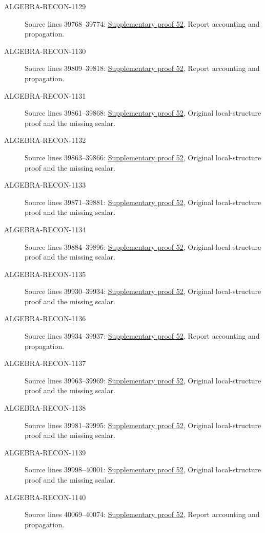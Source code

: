 \begin{description}
\item[ALGEBRA-RECON-1129] Source lines 39768--39774: \hyperlink{algebra_etale_local_notes_20260928}{Supplementary proof 52}, Report accounting and propagation.
\item[ALGEBRA-RECON-1130] Source lines 39809--39818: \hyperlink{algebra_etale_local_notes_20260928}{Supplementary proof 52}, Report accounting and propagation.
\item[ALGEBRA-RECON-1131] Source lines 39861--39868: \hyperlink{algebra_etale_local_notes_20260928}{Supplementary proof 52}, Original local-structure proof and the missing scalar.
\item[ALGEBRA-RECON-1132] Source lines 39863--39866: \hyperlink{algebra_etale_local_notes_20260928}{Supplementary proof 52}, Original local-structure proof and the missing scalar.
\item[ALGEBRA-RECON-1133] Source lines 39871--39881: \hyperlink{algebra_etale_local_notes_20260928}{Supplementary proof 52}, Original local-structure proof and the missing scalar.
\item[ALGEBRA-RECON-1134] Source lines 39884--39896: \hyperlink{algebra_etale_local_notes_20260928}{Supplementary proof 52}, Original local-structure proof and the missing scalar.
\item[ALGEBRA-RECON-1135] Source lines 39930--39934: \hyperlink{algebra_etale_local_notes_20260928}{Supplementary proof 52}, Original local-structure proof and the missing scalar.
\item[ALGEBRA-RECON-1136] Source lines 39934--39937: \hyperlink{algebra_etale_local_notes_20260928}{Supplementary proof 52}, Report accounting and propagation.
\item[ALGEBRA-RECON-1137] Source lines 39963--39969: \hyperlink{algebra_etale_local_notes_20260928}{Supplementary proof 52}, Original local-structure proof and the missing scalar.
\item[ALGEBRA-RECON-1138] Source lines 39981--39995: \hyperlink{algebra_etale_local_notes_20260928}{Supplementary proof 52}, Original local-structure proof and the missing scalar.
\item[ALGEBRA-RECON-1139] Source lines 39998--40001: \hyperlink{algebra_etale_local_notes_20260928}{Supplementary proof 52}, Original local-structure proof and the missing scalar.
\item[ALGEBRA-RECON-1140] Source lines 40069--40074: \hyperlink{algebra_etale_local_notes_20260928}{Supplementary proof 52}, Report accounting and propagation.

\end{description}
